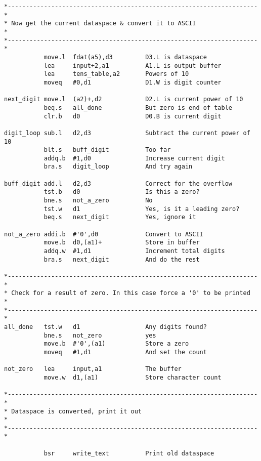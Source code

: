 \begin{lstlisting}[firstnumber=last,caption={Dataspace Program - Part 6 - Print Current Dataspace}]
*---------------------------------------------------------------------*
* Now get the current dataspace & convert it to ASCII                 *
*---------------------------------------------------------------------*
           move.l  fdat(a5),d3         D3.L is dataspace
           lea     input+2,a1          A1.L is output buffer
           lea     tens_table,a2       Powers of 10
           moveq   #0,d1               D1.W is digit counter

next_digit move.l  (a2)+,d2            D2.L is current power of 10
           beq.s   all_done            But zero is end of table
           clr.b   d0                  D0.B is current digit

digit_loop sub.l   d2,d3               Subtract the current power of 10
           blt.s   buff_digit          Too far
           addq.b  #1,d0               Increase current digit
           bra.s   digit_loop          And try again

buff_digit add.l   d2,d3               Correct for the overflow
           tst.b   d0                  Is this a zero?
           bne.s   not_a_zero          No
           tst.w   d1                  Yes, is it a leading zero?
           beq.s   next_digit          Yes, ignore it

not_a_zero addi.b  #'0',d0             Convert to ASCII
           move.b  d0,(a1)+            Store in buffer
           addq.w  #1,d1               Increment total digits
           bra.s   next_digit          And do the rest

*---------------------------------------------------------------------*
* Check for a result of zero. In this case force a '0' to be printed  *
*---------------------------------------------------------------------*
all_done   tst.w   d1                  Any digits found?
           bne.s   not_zero            yes
           move.b  #'0',(a1)           Store a zero
           moveq   #1,d1               And set the count

not_zero   lea     input,a1            The buffer
           move.w  d1,(a1)             Store character count

*---------------------------------------------------------------------*
* Dataspace is converted, print it out                                *
*---------------------------------------------------------------------*

           bsr     write_text          Print old dataspace
\end{lstlisting}

